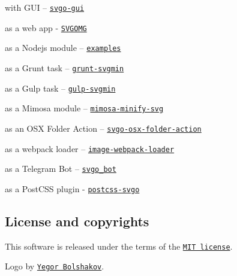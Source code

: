 \begin{DoxyItemize}
\item with G\+UI – \href{https://github.com/svg/svgo-gui}{\tt svgo-\/gui}
\item as a web app -\/ \href{https://jakearchibald.github.io/svgomg/}{\tt S\+V\+G\+O\+MG}
\item as a Nodejs module – \href{https://github.com/svg/svgo/tree/master/examples}{\tt examples}
\item as a Grunt task – \href{https://github.com/sindresorhus/grunt-svgmin}{\tt grunt-\/svgmin}
\item as a Gulp task – \href{https://github.com/ben-eb/gulp-svgmin}{\tt gulp-\/svgmin}
\item as a Mimosa module – \href{https://github.com/dbashford/mimosa-minify-svg}{\tt mimosa-\/minify-\/svg}
\item as an O\+SX Folder Action – \href{https://github.com/svg/svgo-osx-folder-action}{\tt svgo-\/osx-\/folder-\/action}
\item as a webpack loader – \href{https://github.com/tcoopman/image-webpack-loader}{\tt image-\/webpack-\/loader}
\item as a Telegram Bot – \href{https://github.com/maksugr/svgo_bot}{\tt svgo\+\_\+bot}
\item as a Post\+C\+SS plugin -\/ \href{https://github.com/ben-eb/postcss-svgo}{\tt postcss-\/svgo}
\end{DoxyItemize}

\subsection*{License and copyrights}

This software is released under the terms of the \href{https://github.com/svg/svgo/blob/master/LICENSE}{\tt M\+IT license}.

Logo by \href{http://xizzzy.ru/}{\tt Yegor Bolshakov}. 